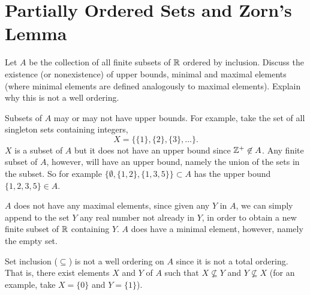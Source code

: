 \section{Partially Ordered Sets and Zorn's Lemma}

 Let $A$ be the collection of all finite subsets of $\mathbb{R}$
ordered by inclusion. Discuss the existence (or nonexistence) of upper
bounds, minimal and maximal elements (where minimal elements are
defined analogously to maximal elements). Explain why this is not a
well ordering.
\begin{solution}
  Subsets of $A$ may or may not have upper bounds. For example, take
  the set of all singleton sets containing integers,
  \begin{equation*}
    X = \{\{1\}, \{2\}, \{3\}, \dots\}.
  \end{equation*}
  $X$ is a subset of $A$ but it does not have an upper bound since
  $\mathbb{Z}^+\not\in A$. Any finite subset of $A$, however, will have an
  upper bound, namely the union of the sets in the subset. So for
  example $\{\emptyset, \{1,2\}, \{1,3,5\}\}\subset A$ has the upper
  bound $\{1,2,3,5\}\in A$.

  $A$ does not have any maximal elements, since given any $Y$ in $A$,
  we can simply append to the set $Y$ any real number not already in
  $Y$, in order to obtain a new finite subset of $\mathbb{R}$ containing
  $Y$. $A$ does have a minimal element, however, namely the empty set.

  Set inclusion ($\subseteq$) is not a well ordering on $A$ since it
  is not a total ordering. That is, there exist elements $X$ and $Y$
  of $A$ such that $X\not\subseteq Y$ and $Y\not\subseteq X$ (for an
  example, take $X = \{0\}$ and $Y = \{1\}$).
\end{solution}
